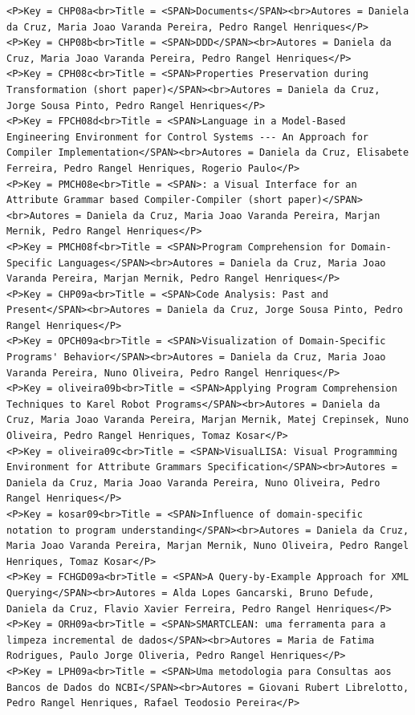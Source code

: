 \documentclass[11pt,a4paper]{report}
\begin{document}
\begin{appendices}
\begin{lstlisting}
<P>Key = CHP08a<br>Title = <SPAN>Documents</SPAN><br>Autores = Daniela da Cruz, Maria Joao Varanda Pereira, Pedro Rangel Henriques</P>
<P>Key = CHP08b<br>Title = <SPAN>DDD</SPAN><br>Autores = Daniela da Cruz, Maria Joao Varanda Pereira, Pedro Rangel Henriques</P>
<P>Key = CPH08c<br>Title = <SPAN>Properties Preservation during Transformation (short paper)</SPAN><br>Autores = Daniela da Cruz, Jorge Sousa Pinto, Pedro Rangel Henriques</P>
<P>Key = FPCH08d<br>Title = <SPAN>Language in a Model-Based Engineering Environment for Control Systems --- An Approach for Compiler Implementation</SPAN><br>Autores = Daniela da Cruz, Elisabete Ferreira, Pedro Rangel Henriques, Rogerio Paulo</P>
<P>Key = PMCH08e<br>Title = <SPAN>: a Visual Interface for an Attribute Grammar based Compiler-Compiler (short paper)</SPAN><br>Autores = Daniela da Cruz, Maria Joao Varanda Pereira, Marjan Mernik, Pedro Rangel Henriques</P>
<P>Key = PMCH08f<br>Title = <SPAN>Program Comprehension for Domain-Specific Languages</SPAN><br>Autores = Daniela da Cruz, Maria Joao Varanda Pereira, Marjan Mernik, Pedro Rangel Henriques</P>
<P>Key = CHP09a<br>Title = <SPAN>Code Analysis: Past and Present</SPAN><br>Autores = Daniela da Cruz, Jorge Sousa Pinto, Pedro Rangel Henriques</P>
<P>Key = OPCH09a<br>Title = <SPAN>Visualization of Domain-Specific Programs' Behavior</SPAN><br>Autores = Daniela da Cruz, Maria Joao Varanda Pereira, Nuno Oliveira, Pedro Rangel Henriques</P>
<P>Key = oliveira09b<br>Title = <SPAN>Applying Program Comprehension Techniques to Karel Robot Programs</SPAN><br>Autores = Daniela da Cruz, Maria Joao Varanda Pereira, Marjan Mernik, Matej Crepinsek, Nuno Oliveira, Pedro Rangel Henriques, Tomaz Kosar</P>
<P>Key = oliveira09c<br>Title = <SPAN>VisualLISA: Visual Programming Environment for Attribute Grammars Specification</SPAN><br>Autores = Daniela da Cruz, Maria Joao Varanda Pereira, Nuno Oliveira, Pedro Rangel Henriques</P>
<P>Key = kosar09<br>Title = <SPAN>Influence of domain-specific notation to program understanding</SPAN><br>Autores = Daniela da Cruz, Maria Joao Varanda Pereira, Marjan Mernik, Nuno Oliveira, Pedro Rangel Henriques, Tomaz Kosar</P>
<P>Key = FCHGD09a<br>Title = <SPAN>A Query-by-Example Approach for XML Querying</SPAN><br>Autores = Alda Lopes Gancarski, Bruno Defude, Daniela da Cruz, Flavio Xavier Ferreira, Pedro Rangel Henriques</P>
<P>Key = ORH09a<br>Title = <SPAN>SMARTCLEAN: uma ferramenta para a limpeza incremental de dados</SPAN><br>Autores = Maria de Fatima Rodrigues, Paulo Jorge Oliveria, Pedro Rangel Henriques</P>
<P>Key = LPH09a<br>Title = <SPAN>Uma metodologia para Consultas aos Bancos de Dados do NCBI</SPAN><br>Autores = Giovani Rubert Librelotto, Pedro Rangel Henriques, Rafael Teodosio Pereira</P>

\end{lstlisting}
\end{appendices}
\end{document}
